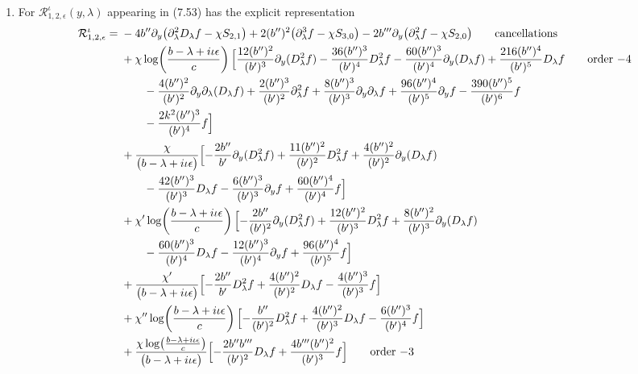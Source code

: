 \documentclass[reqno,11pt]{amsart}
\numberwithin{equation}{section}
\newcommand{\p}{\partial}
\newcommand{\D}{D_\lambda}
\numberwithin{equation}{section} %
\begin{document}
\begin{enumerate}
\item For $\mathcal{R}^\iota_{1,2,\epsilon}(y,\lambda)$ appearing in (7.53) has the explicit representation
\setlength{\jot}{3pt}
\begin{align}
\mathcal{R}^\iota_{1,2,\epsilon}={}&-4b'' \p_y\bigl(\p_\lambda^2\D f-\chi S_{2,1}\bigr)+2(b'' )^{2}\bigl(\p_\lambda^3f-\chi S_{3,0}\bigr)-2b''' \p_y\bigl(\p_\lambda^2f-\chi S_{2,0}\bigr)\tag*{\text{cancellations}}\\
&+\chi\log\!\left(\frac{b -\lambda+i\iota\epsilon}{c}\right)\Bigl[\frac{12 (b'' )^{2}}{(b' )^{3}} \p_y(\D^2 f)- \frac{36 (b'' )^{3}}{(b' )^{4}} \D^2 f- \frac{60 (b'' )^{3}}{(b' )^{4}} \p_y(\D f)+\frac{216 (b'' )^{4}}{(b' )^{5}} \D f\tag*{\text{order $-4$}}\\
&\qquad - \frac{4 (b'' )^{2}}{(b' )^{2}} \p_y\p_\lambda(\D f)+\frac{2 (b'' )^{3}}{(b' )^{2}} \p_\lambda^2 f+\frac{8 (b'' )^{3}}{(b' )^{3}} \p_y\p_\lambda f+\frac{96 (b'' )^{4}}{(b' )^{5}} \p_y f- \frac{390 (b'' )^{5}}{(b' )^{6}} f \notag\\
&\qquad - \frac{2 k^2 (b'' )^{3}}{(b' )^{4}} f\Bigr]\notag\\
&+\frac{\chi}{\bigl(b -\lambda+i\iota\epsilon\bigr)}\Bigl[- \frac{2 b'' }{b' } \p_y(\D^2 f)+\frac{11 (b'' )^{2}}{(b' )^{2}} \D^2 f+\frac{4 (b'' )^{2}}{(b' )^{2}} \p_y(\D f)\notag\\
&\qquad - \frac{42 (b'' )^{3}}{(b' )^{3}} \D f- \frac{6 (b'' )^{3}}{(b' )^{3}} \p_y f+\frac{60 (b'' )^{4}}{(b' )^{4}} f\Bigr]\notag\\
&+\chi'\log\!\left(\frac{b -\lambda+i\iota\epsilon}{c}\right)\Bigl[- \frac{2 b'' }{(b' )^{2}} \p_y(\D^2 f) +\frac{12 (b'' )^{2}}{(b' )^{3}} \D^2 f+\frac{8 (b'' )^{2}}{(b' )^{3}} \p_y(\D f)\notag\\
&\qquad - \frac{60 (b'' )^{3}}{(b' )^{4}} \D f- \frac{12 (b'' )^{3}}{(b' )^{4}} \p_y f+\frac{96 (b'' )^{4}}{(b' )^{5}} f\Bigr]\notag\\
&+\frac{\chi'}{\bigl(b -\lambda+i\iota\epsilon\bigr)}\Bigl[- \frac{2 b'' }{b' } \D^2 f+\frac{4 (b'' )^{2}}{(b' )^{2}} \D f- \frac{4 (b'' )^{3}}{(b' )^{3}} f\Bigr]\notag\\
&+\chi''\log\!\left(\frac{b -\lambda+i\iota\epsilon}{c}\right)\Bigl[- \frac{b'' }{(b' )^{2}} \D^2 f+\frac{4 (b'' )^{2}}{(b' )^{3}} \D f- \frac{6 (b'' )^{3}}{(b' )^{4}} f\Bigr]\notag\\
&+\frac{\chi\log\!\left(\frac{b -\lambda+i\iota\epsilon}{c}\right)}{\bigl(b -\lambda+i\iota\epsilon\bigr)}\Bigl[- \frac{2 b''  b''' }{(b' )^{2}} \D f+\frac{4 b'''  (b'' )^{2}}{(b' )^{3}} f\Bigr]\tag*{\text{order $-3$}}\\

\end{align}
\end{enumerate}
\end{document}
